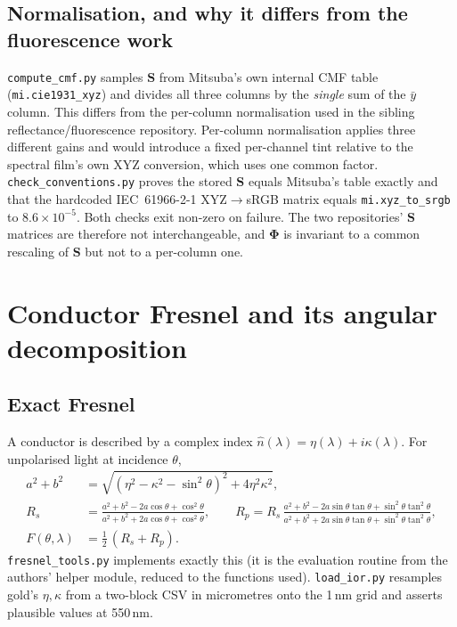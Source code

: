 \documentclass[11pt,a4paper]{article}
\newcommand{\mS}{\mathbf{S}}
\newcommand{\mPhi}{\boldsymbol{\Phi}}
\newcommand{\lam}{\lambda}
\newcommand{\file}[1]{\texttt{#1}}
\newcommand{\code}[1]{\texttt{#1}}
\begin{document}
\subsection{Normalisation, and why it differs from the fluorescence work}
\label{sec:norm}

\file{compute\_cmf.py} samples $\mS$ from Mitsuba's own internal CMF table
(\code{mi.cie1931\_xyz}) and divides all three columns by the \emph{single}
sum of the $\bar y$ column.  This differs from the per-column normalisation used in the sibling reflectance/fluorescence
repository.  Per-column normalisation applies three different gains and would
introduce a fixed per-channel tint relative to the spectral film's own
XYZ conversion, which uses one common factor.  \file{check\_conventions.py}
proves the stored $\mS$ equals Mitsuba's table exactly and that the hardcoded
IEC~61966-2-1 XYZ$\to$sRGB matrix equals \code{mi.xyz\_to\_srgb} to
$8.6\times10^{-5}$.  Both checks exit non-zero on failure.  The two
repositories' $\mS$ matrices are therefore not interchangeable, and $\mPhi$ is
invariant to a common rescaling of $\mS$ but not to a per-column one.

\section{Conductor Fresnel and its angular decomposition}
\label{sec:fresnel}

\subsection{Exact Fresnel}

A conductor is described by a complex index $\hat n(\lam)=\eta(\lam)+i\kappa(\lam)$.
For unpolarised light at incidence $\theta$,
\begin{align}
  a^2+b^2 &= \sqrt{(\eta^2-\kappa^2-\sin^2\theta)^2+4\eta^2\kappa^2},\\
  R_s &= \frac{a^2+b^2-2a\cos\theta+\cos^2\theta}{a^2+b^2+2a\cos\theta+\cos^2\theta},\qquad
  R_p = R_s\,\frac{a^2+b^2-2a\sin\theta\tan\theta+\sin^2\theta\tan^2\theta}
                 {a^2+b^2+2a\sin\theta\tan\theta+\sin^2\theta\tan^2\theta},\\
  F(\theta,\lam) &= \tfrac12\,(R_s+R_p).
\end{align}
\file{fresnel\_tools.py} implements exactly this (it is the evaluation routine
from the authors' helper module, reduced to the functions used).
\file{load\_ior.py} resamples gold's $\eta,\kappa$ from a two-block CSV in
micrometres onto the 1\,nm grid and asserts plausible values at 550\,nm.
\end{document}
